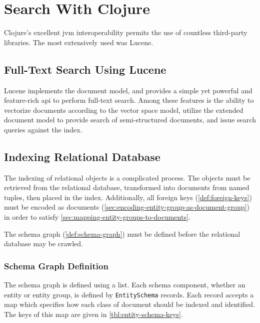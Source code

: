 \section{Search With Clojure}
\label{sec:search-with-clojure}
	Clojure's excellent \gls{jvm} interoperability permits the use of countless third-party libraries.  The most extensively used was Lucene.
	
	\subsection{Full-Text Search Using Lucene}
		  Lucene implements the document model, and provides a simple yet powerful and feature-rich \gls{api} to perform full-text search.  Among these features is the ability to vectorize documents according to the vector space model, utilize the extended document model to provide search of semi-structured documents, and issue search queries against the index.
	
	\subsection{Indexing Relational Database}
		The indexing of relational objects is a complicated process.  The objects must be retrieved from the relational database, transformed into documents from named tuples, then placed in the index.  Additionally, all foreign keys (\cref{def:foreign-keys}) must be encoded as documents (\cref{sec:encoding-entity-group-as-document-group}) in order to satisfy \cref{sec:mapping-entity-groups-to-documents}.
		
		The schema graph (\cref{def:schema-graph}) must be defined before the relational database may be crawled.
		
		\subsubsection{Schema Graph Definition}
		\label{sec:entity-schema}
			The schema graph is defined using a list.  Each schema component, whether an entity or entity group, is defined by \texttt{EntitySchema} records.  Each record accepts a map which specifies how each class of document should be indexed and identified.  The keys of this map are given in \cref{tbl:entity-schema-keys}.
			
